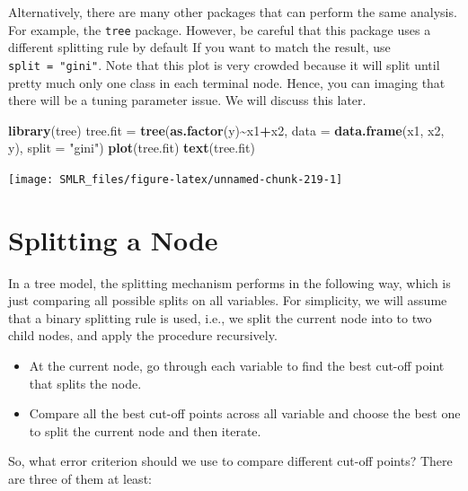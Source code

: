 \documentclass[
]{book}
\newenvironment{Shaded}{\begin{snugshade}}{\end{snugshade}}
\newcommand{\AttributeTok}[1]{\textcolor[rgb]{0.13,0.29,0.53}{#1}}
\newcommand{\FunctionTok}[1]{\textcolor[rgb]{0.13,0.29,0.53}{\textbf{#1}}}
\newcommand{\NormalTok}[1]{#1}
\newcommand{\OtherTok}[1]{\textcolor[rgb]{0.56,0.35,0.01}{#1}}
\newcommand{\SpecialCharTok}[1]{\textcolor[rgb]{0.81,0.36,0.00}{\textbf{#1}}}
\newcommand{\StringTok}[1]{\textcolor[rgb]{0.31,0.60,0.02}{#1}}
\providecommand{\tightlist}{%
  \setlength{\itemsep}{0pt}\setlength{\parskip}{0pt}}
\theoremstyle{definition}
\theoremstyle{definition}
\theoremstyle{definition}
\theoremstyle{definition}
\theoremstyle{remark}
\begin{document}
Alternatively, there are many other packages that can perform the same analysis. For example, the \texttt{tree} package. However, be careful that this package uses a different splitting rule by default If you want to match the result, use \texttt{split\ =\ "gini"}. Note that this plot is very crowded because it will split until pretty much only one class in each terminal node. Hence, you can imaging that there will be a tuning parameter issue. We will discuss this later.

\begin{Shaded}
\begin{Highlighting}[]
    \FunctionTok{library}\NormalTok{(tree)}
\NormalTok{    tree.fit }\OtherTok{=} \FunctionTok{tree}\NormalTok{(}\FunctionTok{as.factor}\NormalTok{(y)}\SpecialCharTok{\textasciitilde{}}\NormalTok{x1}\SpecialCharTok{+}\NormalTok{x2, }\AttributeTok{data =} \FunctionTok{data.frame}\NormalTok{(x1, x2, y), }\AttributeTok{split =} \StringTok{"gini"}\NormalTok{)}
    \FunctionTok{plot}\NormalTok{(tree.fit)}
    \FunctionTok{text}\NormalTok{(tree.fit)}
\end{Highlighting}
\end{Shaded}

\begin{center}\texttt{[image: SMLR\_files/figure-latex/unnamed-chunk-219-1]} \end{center}

\hypertarget{splitting-a-node}{%
\section{Splitting a Node}\label{splitting-a-node}}

In a tree model, the splitting mechanism performs in the following way, which is just comparing all possible splits on all variables. For simplicity, we will assume that a binary splitting rule is used, i.e., we split the current node into to two child nodes, and apply the procedure recursively.

\begin{itemize}
\tightlist
\item
  At the current node, go through each variable to find the best cut-off point that splits the node.
\item
  Compare all the best cut-off points across all variable and choose the best one to split the current node and then iterate.
\end{itemize}

So, what error criterion should we use to compare different cut-off points? There are three of them at least:
\end{document}
